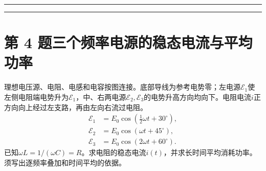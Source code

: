 \documentclass[UTF8,fontset=fandol,a4paper,11pt]{ctexart}
\begin{document}
\par\vspace{5mm}\par\vspace{3mm}\noindent\textcolor{rulegray}{\rule{\linewidth}{0.3pt}}\par\vspace{12mm}\noindent\textcolor{rulegray}{\rule{\linewidth}{0.3pt}}

\clearpage


\section*{第 4 题\quad 三个频率电源的稳态电流与平均功率}\label{q:4}


理想电压源、电阻、电感和电容按图连接。底部导线为参考电势零；左电源$\mathcal E_1$使左侧电阻端电势升为$\mathcal E_1$，中、右两电源$\mathcal E_2,\mathcal E_3$的电势升高方向均向下。电阻电流$i$正方向向上经过左支路，再由左向右流过电阻。
\[
\begin{aligned}
\mathcal E_1&=E_0\cos(\tfrac12\omega t+30^\circ),\\
\mathcal E_2&=E_0\cos(\omega t+45^\circ),\\
\mathcal E_3&=E_0\cos(2\omega t+60^\circ).
\end{aligned}
\]
已知$\omega L=1/(\omega C)=R$。求电阻的稳态电流$i(t)$，并求长时间平均消耗功率。须写出逐频率叠加和时间平均的依据。
\end{document}
